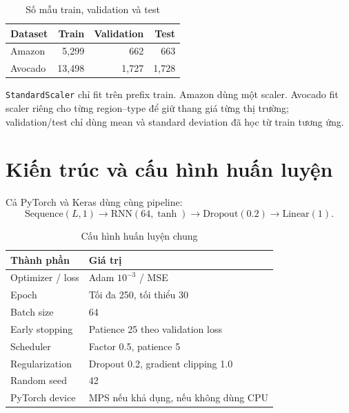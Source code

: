 \documentclass[12pt,a4paper]{report}
\newcommand{\codeinline}[1]{\texttt{#1}}
\begin{document}
\begin{table}[H]
\centering
\caption{Số mẫu train, validation và test}
\label{tab:split}
\begin{tabular}{lrrr}
\toprule
\textbf{Dataset} & \textbf{Train} & \textbf{Validation} & \textbf{Test} \\
\midrule
Amazon & 5,299 & 662 & 663 \\
Avocado & 13,498 & 1,727 & 1,728 \\
\bottomrule
\end{tabular}
\end{table}

\codeinline{StandardScaler} chỉ fit trên prefix train. Amazon dùng một scaler.
Avocado fit scaler riêng cho từng region--type để giữ thang giá từng thị trường; validation/test chỉ
dùng mean và standard deviation đã học từ train tương ứng.

\section{Kiến trúc và cấu hình huấn luyện}
Cả PyTorch và Keras dùng cùng pipeline:
\begin{equation}
    \text{Sequence}(L,1)
    \rightarrow \text{RNN}(64,\tanh)
    \rightarrow \text{Dropout}(0.2)
    \rightarrow \text{Linear}(1).
\end{equation}

\begin{table}[H]
\centering
\caption{Cấu hình huấn luyện chung}
\label{tab:training_config}
\begin{tabular}{ll}
\toprule
\textbf{Thành phần} & \textbf{Giá trị} \\
\midrule
Optimizer / loss & Adam $10^{-3}$ / MSE \\
Epoch & Tối đa 250, tối thiểu 30 \\
Batch size & 64 \\
Early stopping & Patience 25 theo validation loss \\
Scheduler & Factor 0.5, patience 5 \\
Regularization & Dropout 0.2, gradient clipping 1.0 \\
Random seed & 42 \\
PyTorch device & MPS nếu khả dụng, nếu không dùng CPU \\
\bottomrule
\end{tabular}
\end{table}
\end{document}
